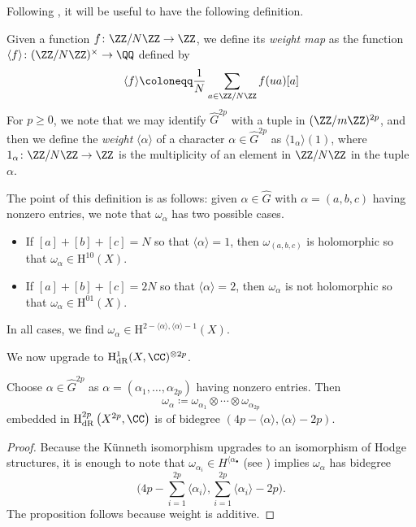 \documentclass[../thesis.tex]{subfiles}
\begin{document}
Following \cite[Proposition~7.6]{deligne-hodge}, it will be useful to have the following definition.
\begin{definition}[weight]
	Given a function $f\colon\ZZ/N\ZZ\to\ZZ$, we define its \textit{weight map} as the function $\langle f\rangle\colon(\ZZ/N\ZZ)^\times\to\QQ$ defined by
	\[\langle f\rangle\coloneqq\frac1N\sum_{a\in\ZZ/N\ZZ}f(ua)[a]\]
	For $p\ge0$, we note that we may identify $\widehat G^{2p}$ with a tuple in $(\ZZ/m\ZZ)^{2p}$, and then we define the \textit{weight} $\langle\alpha\rangle$ of a character $\alpha\in\widehat G^{2p}$ as $\langle1_\alpha\rangle(1)$, where $1_\alpha\colon\ZZ/N\ZZ\to\ZZ$ is the multiplicity of an element in $\ZZ/N\ZZ$ in the tuple $\alpha$. 
\end{definition}
\begin{remark} \label{rem:deg-by-weight-curve}
	The point of this definition is as follows: given $\alpha\in\widehat G$ with $\alpha=(a,b,c)$ having nonzero entries, we note that $\omega_{\alpha}$ has two possible cases.
	\begin{itemize}
		\item If $[a]+[b]+[c]=N$ so that $\langle\alpha\rangle=1$, then $\omega_{(a,b,c)}$ is holomorphic so that $\omega_{\alpha}\in\mathrm H^{10}(X)$.
		\item If $[a]+[b]+[c]=2N$ so that $\langle\alpha\rangle=2$, then $\omega_{\alpha}$ is not holomorphic so that $\omega_{\alpha}\in\mathrm H^{01}(X)$.
	\end{itemize}
	In all cases, we find $\omega_{\alpha}\in\mathrm H^{2-\langle\alpha\rangle,\langle\alpha\rangle-1}(X)$.
\end{remark}
We now upgrade  to $\mathrm H^1_{\mathrm{dR}}(X,\CC)^{\otimes2p}$.
\begin{lemma} \label{lem:deg-by-weight-curve-power}
	Choose $\alpha\in\widehat G^{2p}$ as $\alpha=(\alpha_1,\ldots,\alpha_{2p})$ having nonzero entries. Then
	\[\omega_{\alpha}\coloneqq\omega_{\alpha_1}\otimes\cdots\otimes\omega_{\alpha_{2p}}\]
	embedded in $\mathrm H^{2p}_{\mathrm{dR}}\left(X^{2p},\CC\right)$ is of bidegree $(4p-\langle\alpha\rangle,\langle\alpha\rangle-2p)$.
\end{lemma}
\begin{proof}
	Because the K\"unneth isomorphism upgrades to an isomorphism of Hodge structures, it is enough to note that $\omega_{\alpha_i}\in H^{\langle\alpha_\bullet}$ (see ) implies $\omega_\alpha$ has bidegree
	\[\Bigg(4p-\sum_{i=1}^{2p}\langle\alpha_i\rangle,\sum_{i=1}^{2p}\langle\alpha_i\rangle-2p\Bigg).\]
	The proposition follows because weight is additive.
\end{proof}
\end{document}
